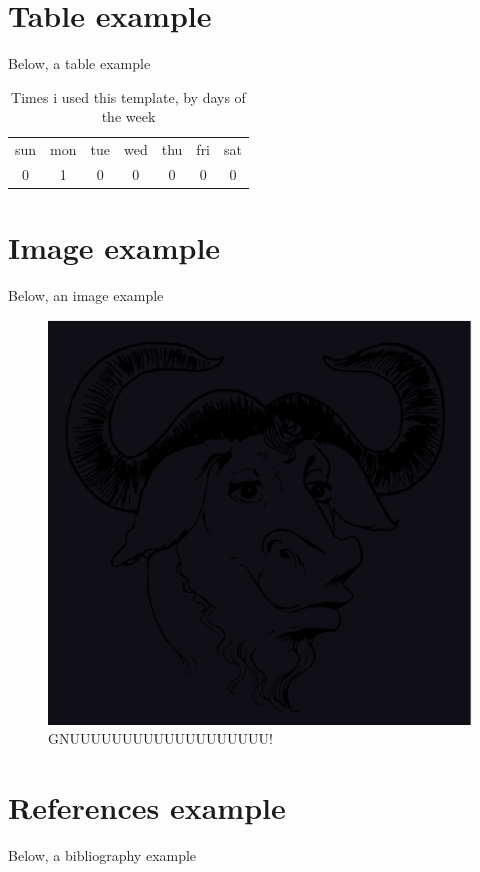 \documentclass [12pt,oneside] {article}
\begin{document}
\section{Table example}

Below, a table example

\begin{table}[!htp]
\centering
\caption{Times i used this template, by days of the week}
\label{time-0x1}
\begin{tabular}{|ccccccc|}
\cline{1-7}
sun	& mon	& tue	& wed	& thu	& fri	& sat	\\
0	& 1	& 0	& 0 	& 0 	& 0	& 0	\\
\hline
\end{tabular}
\end{table}

\section{Image example}

Below, an image example

\begin{figure}[!htb]
\centering
\includegraphics[width=12cm]{example.eps}
\caption{GNUUUUUUUUUUUUUUUUUUU!}
\label{GNUUUUUUUUUUUUUUUUUUU!}
\end{figure}

\section{References example}

Below, a bibliography example



\end{document}
